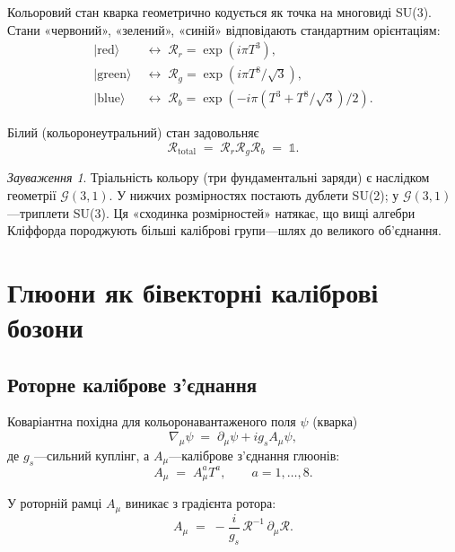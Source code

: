 \documentclass[11pt,a4paper]{article}
\newcommand{\Rotor}{\mathcal{R}}
\newcommand{\Cl}{\mathcal{G}}
\newcommand{\D}{\nabla}
\theoremstyle{definition}
\theoremstyle{plain}
\theoremstyle{remark}
\newtheorem{remark}{Зауваження}[section]
\begin{document}
Кольоровий стан кварка геометрично кодується як точка на многовиді SU(3). Стани «червоний», «зелений», «синій» відповідають стандартним орієнтаціям:
\begin{align}
|\mathrm{red}\rangle &\;\leftrightarrow\; \Rotor_r = \exp(i\pi T^3), \\
|\mathrm{green}\rangle &\;\leftrightarrow\; \Rotor_g = \exp(i\pi T^8/\sqrt{3}), \\
|\mathrm{blue}\rangle &\;\leftrightarrow\; \Rotor_b = \exp(-i\pi(T^3 + T^8/\sqrt{3})/2).
\end{align}

Білий (кольоронеутральний) стан задовольняє
\begin{equation}
\Rotor_{\mathrm{total}} \;=\; \Rotor_r \Rotor_g \Rotor_b \;=\; \mathbb{1}.
\end{equation}

\begin{remark}
Тріальність кольору (три фундаментальні заряди) є наслідком геометрії $\Cl(3,1)$. У нижчих розмірностях постають дублети SU(2); у $\Cl(3,1)$—триплети SU(3). Ця «сходинка розмірностей» натякає, що вищі алгебри Кліффорда породжують більші каліброві групи—шлях до великого об’єднання.
\end{remark}

\vspace{1em}

\section{Глюони як бівекторні каліброві бозони}
\label{sec:gluons}

\subsection{Роторне каліброве з’єднання}

Коваріантна похідна для кольоронавантаженого поля $\psi$ (кварка)
\begin{equation}
\D_\mu \psi \;=\; \partial_\mu \psi + ig_s A_\mu \psi,
\label{eq:covariant-derivative}
\end{equation}
де $g_s$—сильний куплінг, а $A_\mu$—каліброве з’єднання глюонів:
\begin{equation}
A_\mu \;=\; A_\mu^a T^a, \qquad a=1,\ldots,8.
\label{eq:gluon-connection}
\end{equation}

У роторній рамці $A_\mu$ виникає з градієнта ротора:
\begin{equation}
A_\mu \;=\; -\frac{i}{g_s}\,\Rotor^{-1}\,\partial_\mu\Rotor.
\label{eq:rotor-connection}
\end{equation}
\end{document}
